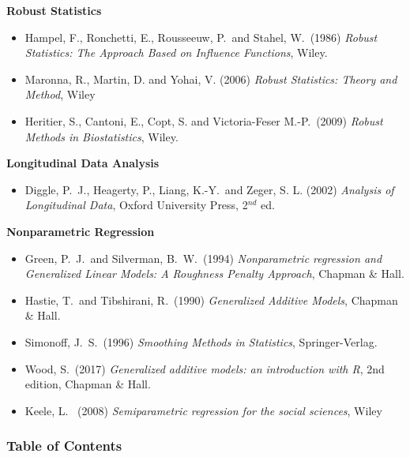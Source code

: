 \documentclass{beamer}
\begin{document}
\begin{frame}
\textbf{Robust Statistics}
\begin{itemize}
\item Hampel, F.,  Ronchetti, E.,  Rousseeuw, P.\ and Stahel, W.\ (1986) \textit{Robust Statistics: The Approach Based on Influence Functions}, Wiley.
\item Maronna, R., Martin, D. and Yohai, V. (2006) \textit{Robust Statistics: Theory and Method}, Wiley
\item Heritier, S., Cantoni, E., Copt, S. and Victoria-Feser M.-P.\ (2009) \textit{Robust Methods in Biostatistics}, Wiley.
\end{itemize}

\textbf{Longitudinal Data Analysis}
\begin{itemize}
\item Diggle, P.\ J., Heagerty, P., Liang, K.-Y.\ and Zeger, S. L. (2002) \textit{Analysis of Longitudinal Data}, Oxford University Press, 2$^{nd}$ ed.
\end{itemize}
\end{frame}


\begin{frame}
\textbf{Nonparametric Regression}
\begin{itemize}
\item Green, P.\ J.\ and Silverman, B.\ W.\ (1994) \textit{Nonparametric regression and Generalized Linear Models: A Roughness Penalty Approach}, Chapman \& Hall.
\item Hastie, T.\ and Tibshirani, R.\ (1990) \textit{Generalized Additive Models}, Chapman \& Hall.
\item Simonoff, J.\ S.\ (1996) \textit{Smoothing Methods in Statistics}, Springer-Verlag.
\item Wood, S.\ (2017) \textit{Generalized additive models: an introduction with R}, 2nd edition, Chapman \& Hall.
\item Keele, L. \ (2008) \textit{Semiparametric regression for the social
sciences}, Wiley
\end{itemize}

\nocite{Dobs:2002, Lind:1997,McCu:Neld:1989,Fara:2006,Hamp:Ronc:Rous:Stah:1986,Maro:Mart:Yoha:2006,Heri:Cant:Copt:Vict:2009,Digg:Heag:Lian:Zege:2002,Gree:Silv:1994,Hast:Tibs:1990,Simo:1996,Wood:2017,Keel:2008}
\end{frame}


\begin{frame}
\setcounter{tocdepth}{1}
\frametitle{Table of Contents}
\tableofcontents
\end{frame}
\end{document}
